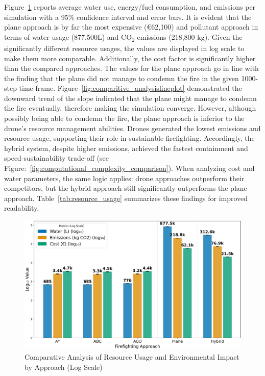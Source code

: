 \documentclass[11pt, a4paper]{article}
\begin{document}
Figure~\ref{fig:resources_analysisBIG} reports average water use, energy/fuel consumption, and emissions per simulation with a 95\% confidence interval and error bars. It is evident that the plane approach is by far the most expensive (€62,100) and pollutant approach in terms of water usage (877,500L) and CO\textsubscript{2} emissions (218,800 kg). Given the significantly different resource usages, the values are displayed in log scale to make them more comparable. Additionally, the cost factor is significantly higher than the compared approaches. The values for the plane approach go in line with the finding that the plane did not manage to condemn the fire in the given 1000-step time-frame. Figure~\ref{fig:comparitive_analysislineplot} demonstrated the downward trend of the slope indicated that the plane might manage to condemn the fire eventually, therefore making the simulation converge. However, although possibly being able to condemn the fire, the plane approach is inferior to the drone's resource management abilities. Drones generated the lowest emissions and resource usage, supporting their role in sustainable firefighting. Accordingly, the hybrid system, despite higher emissions, achieved the fastest containment and speed-sustainability trade-off (see Figure:~\ref{fig:computational_complexity_comparison}). When analyzing cost and water parameters, the same logic applies: drone approaches outperform their competitors, but the hybrid approach still significantly outperforms the plane approach. Table~\ref{tab:resource_usage} summarizes these findings for improved readability. 

\begin{figure}[htbp]
    \centering
    \includegraphics[width=1\linewidth]{figures/resource_analysis_log.jpeg}
    \caption{Comparative Analysis of Resource Usage and Environmental Impact by Approach (Log Scale)}
    \label{fig:resources_analysisBIG}
\end{figure}
\end{document}
